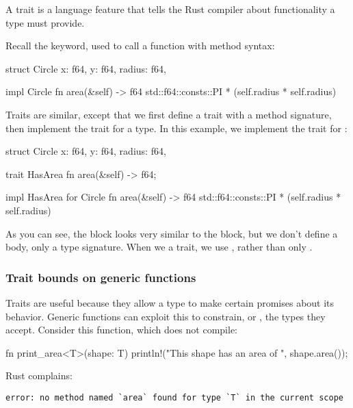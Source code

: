 A trait is a language feature that tells the Rust compiler about functionality a type must provide.

\blank

Recall the  keyword, used to call a function with method syntax:

\begin{rustc}
struct Circle {
    x: f64,
    y: f64,
    radius: f64,
}

impl Circle {
    fn area(&self) -> f64 {
        std::f64::consts::PI * (self.radius * self.radius)
    }
}
\end{rustc}

Traits are similar, except that we first define a trait with a method signature, then implement the trait for a type. In this example, we 
implement the trait  for :

\begin{rustc}
struct Circle {
    x: f64,
    y: f64,
    radius: f64,
}

trait HasArea {
    fn area(&self) -> f64;
}

impl HasArea for Circle {
    fn area(&self) -> f64 {
        std::f64::consts::PI * (self.radius * self.radius)
    }
}
\end{rustc}

As you can see, the  block looks very similar to the  block, but we don't define a body, only a type signature. When 
we  a trait, we use , rather than only .

\subsubsection*{Trait bounds on generic functions}

Traits are useful because they allow a type to make certain promises about its behavior. Generic functions can exploit this to constrain, 
or , the types they accept. Consider this function, which does not compile:

\begin{rustc}
fn print_area<T>(shape: T) {
    println!("This shape has an area of {}", shape.area());
}
\end{rustc}

Rust complains:

\begin{verbatim}
error: no method named `area` found for type `T` in the current scope
\end{verbatim}

